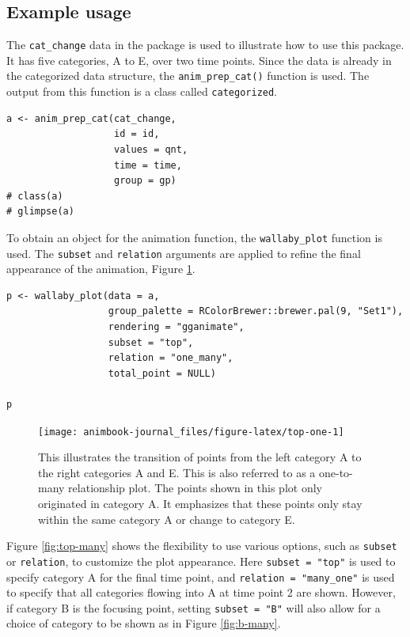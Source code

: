 \subsection{Example usage}\label{example-usage}

The \texttt{cat\_change} data in the  package is used to illustrate how to use this package. It has five categories, A to E, over two time points. Since the data is already in the categorized data structure, the \texttt{anim\_prep\_cat()} function is used. The output from this function is a class called \texttt{categorized}.

\begin{verbatim}
a <- anim_prep_cat(cat_change, 
                   id = id, 
                   values = qnt, 
                   time = time, 
                   group = gp)
# class(a)
# glimpse(a)
\end{verbatim}

To obtain an object for the animation function, the \texttt{wallaby\_plot} function is used. The \texttt{subset} and \texttt{relation} arguments are applied to refine the final appearance of the animation, Figure \ref{fig:top-one}.

\begin{verbatim}
p <- wallaby_plot(data = a,
                  group_palette = RColorBrewer::brewer.pal(9, "Set1"),
                  rendering = "gganimate",
                  subset = "top",
                  relation = "one_many",
                  total_point = NULL)

p
\end{verbatim}

\begin{figure}

{\centering \texttt{[image: animbook-journal\_files/figure-latex/top-one-1]} 

}

\caption{This illustrates the transition of points from the left category A to the right categories A and E. This is also referred to as a one-to-many relationship plot. The points shown in this plot only originated in category A. It emphasizes that these points only stay within the same category A or change to category E.}\label{fig:top-one}
\end{figure}

Figure \ref{fig:top-many} shows the flexibility to use various options, such as \texttt{subset} or \texttt{relation}, to customize the plot appearance. Here \texttt{subset\ =\ "top"} is used to specify category A for the final time point, and \texttt{relation\ =\ "many\_one"} is used to specify that all categories flowing into A at time point 2 are shown. However, if category B is the focusing point, setting \texttt{subset\ =\ "B"} will also allow for a choice of category to be shown as in Figure \ref{fig:b-many}.

